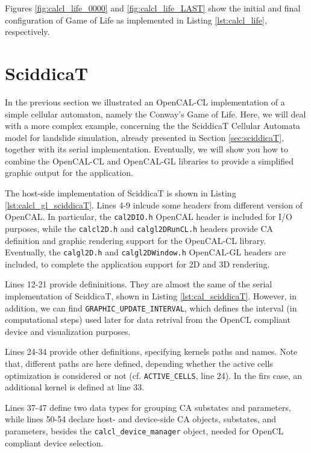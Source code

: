 Figures \ref{fig:calcl_life_0000} and \ref{fig:calcl_life_LAST} show the initial
and final configuration of Game of Life as implemented in Listing
\ref{lst:calcl_life}, respectively.


\section{SciddicaT}\label{sec:calcl_sciddicaT}
In the previous section we illustrated an OpenCAL-CL implementation of
a simple cellular automaton, namely the Conway’s Game of Life. Here,
we will deal with a more complex example, concerning the the SciddicaT
Cellular Automata model for landslide simulation, already presented in
Section \ref{sec:sciddicaT}, together with its serial
implementation. Eventually, we will show you how to combine the
OpenCAL-CL and OpenCAL-GL libraries to provide a simplified graphic
output for the application.



The host-side implementation of SciddicaT is shown in Listing
\ref{lst:calcl_gl_sciddicaT}. Lines 4-9 inlcude some headers from
different version of OpenCAL. In particular, the \verb'cal2DIO.h'
OpenCAL header is included for I/O purposes, while the
\verb'calcl2D.h' and \verb'calgl2DRunCL.h' headers provide CA
definition and graphic rendering support for the OpenCAL-CL
library. Eventually, the \verb'calgl2D.h' and \verb'calgl2DWindow.h'
OpenCAL-GL headers are included, to complete the application support
for 2D and 3D rendering.

Lines 12-21 provide defininitions. They are almost the same of the
serial implementation of SciddicaT, shown in Listing
\ref{lst:cal_sciddicaT}. However, in addition, we can find
\verb'GRAPHIC_UPDATE_INTERVAL', which defines the interval (in
computational steps) used later for data retrival from the OpenCL
compliant device and visualization purposes.

Lines 24-34 provide other definitions, specifying kernels paths and
names. Note that, different paths are here defined, depending whether
the active cells optimization is considered or not
(cf. \verb'ACTIVE_CELLS', line 24). In the firs case, an additional
kernel is defined at line 33.

Lines 37-47 define two data types for grouping CA substates and
parameters, while lines 50-54 declare host- and device-side CA
objects, substates, and parameters, besides the
\verb'calcl_device_manager' object, needed for OpenCL compliant device
selection.

